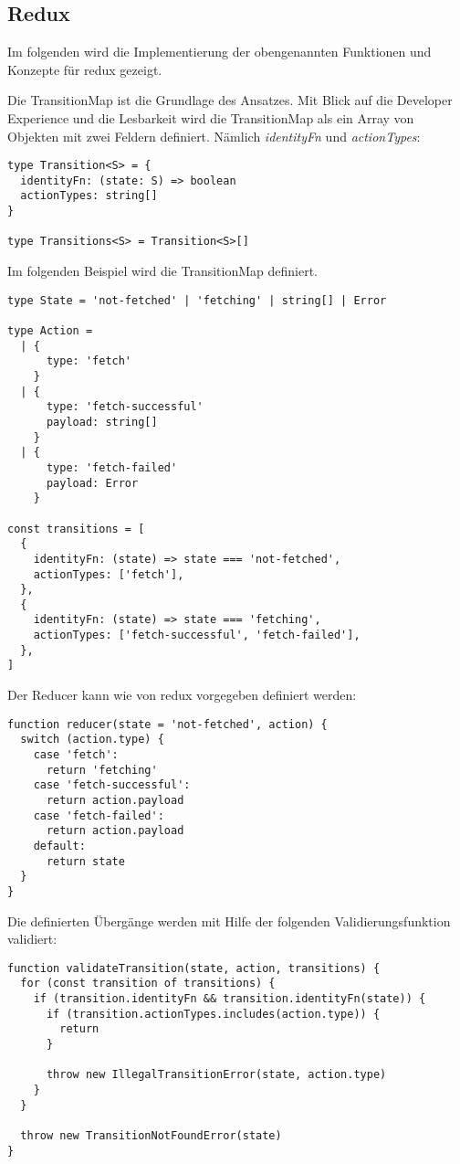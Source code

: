 \subsection{Redux}

Im folgenden wird die Implementierung der obengenannten Funktionen und Konzepte für redux gezeigt.

Die TransitionMap ist die Grundlage des Ansatzes. Mit Blick auf die Developer Experience und die Lesbarkeit wird die TransitionMap als ein Array von Objekten mit zwei Feldern definiert. Nämlich \textit{identityFn} und \textit{actionTypes}:

\begin{lstlisting}
type Transition<S> = {
  identityFn: (state: S) => boolean
  actionTypes: string[]
}
  
type Transitions<S> = Transition<S>[]
\end{lstlisting}

Im folgenden Beispiel wird die TransitionMap definiert.

\begin{lstlisting}
type State = 'not-fetched' | 'fetching' | string[] | Error

type Action =
  | {
      type: 'fetch'
    }
  | {
      type: 'fetch-successful'
      payload: string[]
    }
  | {
      type: 'fetch-failed'
      payload: Error
    }
  
const transitions = [
  {
    identityFn: (state) => state === 'not-fetched',
    actionTypes: ['fetch'],
  },
  {
    identityFn: (state) => state === 'fetching',
    actionTypes: ['fetch-successful', 'fetch-failed'],
  },
]
\end{lstlisting}

Der Reducer kann wie von redux vorgegeben definiert werden:

\begin{lstlisting}
function reducer(state = 'not-fetched', action) {
  switch (action.type) {
    case 'fetch':
      return 'fetching'
    case 'fetch-successful':
      return action.payload
    case 'fetch-failed':
      return action.payload
    default:
      return state
  }
}
\end{lstlisting}

Die definierten Übergänge werden mit Hilfe der folgenden Validierungsfunktion validiert:

\begin{lstlisting}
function validateTransition(state, action, transitions) {
  for (const transition of transitions) {
    if (transition.identityFn && transition.identityFn(state)) {
      if (transition.actionTypes.includes(action.type)) {
        return
      }
  
      throw new IllegalTransitionError(state, action.type)
    }
  }
  
  throw new TransitionNotFoundError(state)
}
\end{lstlisting}


